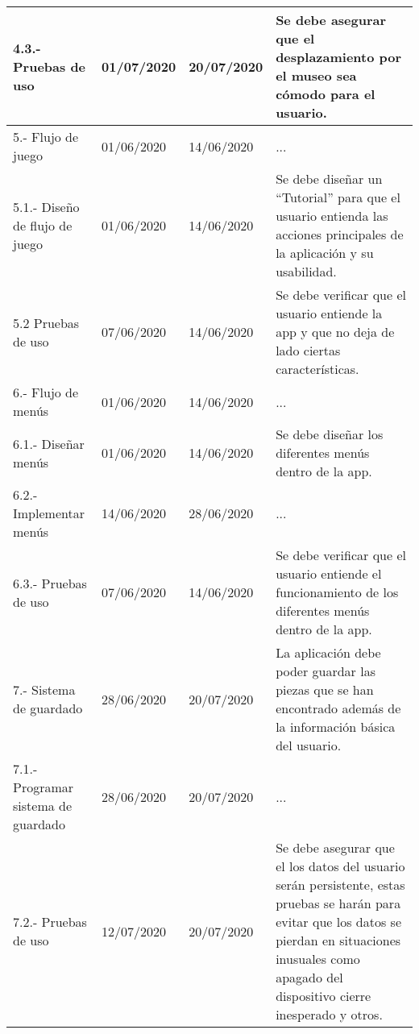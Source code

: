 \begin{longtable}{| p{}| p{}| p{}| p{}|}
\hline 
	4.3.- Pruebas de uso &
	01/07/2020 &
	20/07/2020 &
	Se debe asegurar que el desplazamiento por el museo sea cómodo para el usuario.
\\
\hline 
	5.- Flujo de juego &
	01/06/2020 &
	14/06/2020 & 
	...
	\\
\hline 
	5.1.- Diseño de flujo de juego &
	01/06/2020 &
	14/06/2020 &
	Se debe diseñar un “Tutorial” para que el usuario entienda las acciones principales de la aplicación y su usabilidad.
\\
\hline 
	5.2 Pruebas de uso &
	07/06/2020 &
	14/06/2020 & 
	Se debe verificar que el usuario entiende la app y que no deja de lado ciertas características.
\\
\hline 
	6.- Flujo de menús &
	01/06/2020 &
	14/06/2020 &
	...
\\ 
\hline 
	6.1.- Diseñar menús &
	01/06/2020 &
	14/06/2020 &
	Se debe diseñar los diferentes menús dentro de la app.
\\
\hline 
	6.2.- Implementar menús &
	14/06/2020 &
	28/06/2020 &
	...
\\ 
\hline 
	6.3.- Pruebas de uso &
	07/06/2020 &
	14/06/2020 & 
	Se debe verificar que el usuario entiende el funcionamiento de los diferentes menús dentro de la app.
\\
\hline 
	7.- Sistema de guardado &
	28/06/2020 &
	20/07/2020 & 
	La aplicación debe poder guardar las piezas que se han encontrado además de la información básica del usuario.
\\ 
\hline 
	7.1.- Programar sistema de guardado &
	28/06/2020 &
	20/07/2020 & 
	...
\\ 
\hline 
	7.2.- Pruebas de uso &
	12/07/2020 &
	20/07/2020 &
	Se debe asegurar que el los datos del usuario serán persistente, estas pruebas se harán para evitar que los datos se pierdan en situaciones inusuales como apagado del dispositivo cierre inesperado y otros.
\\
\hline
\end{longtable} 


